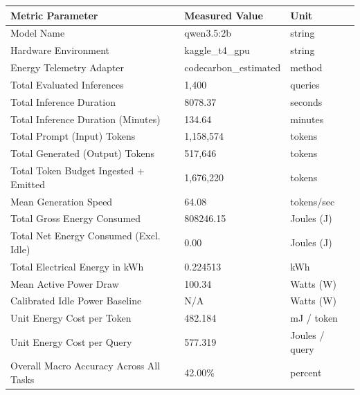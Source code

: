 \begin{tabular}{lll}
\toprule
Metric Parameter & Measured Value & Unit \\
\midrule
Model Name & qwen3.5:2b & string \\
Hardware Environment & kaggle\_t4\_gpu & string \\
Energy Telemetry Adapter & codecarbon\_estimated & method \\
Total Evaluated Inferences & 1,400 & queries \\
Total Inference Duration & 8078.37 & seconds \\
Total Inference Duration (Minutes) & 134.64 & minutes \\
Total Prompt (Input) Tokens & 1,158,574 & tokens \\
Total Generated (Output) Tokens & 517,646 & tokens \\
Total Token Budget Ingested + Emitted & 1,676,220 & tokens \\
Mean Generation Speed & 64.08 & tokens/sec \\
Total Gross Energy Consumed & 808246.15 & Joules (J) \\
Total Net Energy Consumed (Excl. Idle) & 0.00 & Joules (J) \\
Total Electrical Energy in kWh & 0.224513 & kWh \\
Mean Active Power Draw & 100.34 & Watts (W) \\
Calibrated Idle Power Baseline & N/A & Watts (W) \\
Unit Energy Cost per Token & 482.184 & mJ / token \\
Unit Energy Cost per Query & 577.319 & Joules / query \\
Overall Macro Accuracy Across All Tasks & 42.00\% & percent \\
\bottomrule
\end{tabular}

